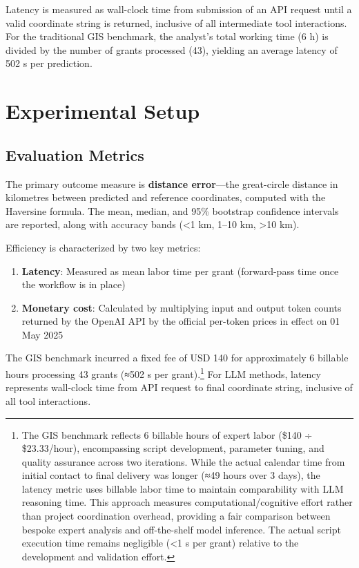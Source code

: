 Latency is measured as wall-clock time from submission of an API request
until a valid coordinate string is returned, inclusive of all
intermediate tool interactions. For the traditional GIS benchmark, the
analyst's total working time (6 h) is divided by the number of grants
processed (43), yielding an average latency of 502 s per prediction.

\section{Experimental Setup}\label{experimental-setup}

\subsection{Evaluation Metrics}\label{evaluation-metrics}

The primary outcome measure is \textbf{distance error}---the
great-circle distance in kilometres between predicted and reference
coordinates, computed with the Haversine formula. The mean, median, and
95\% bootstrap confidence intervals are reported, along with accuracy
bands (\textless1 km, 1--10 km, \textgreater10 km).

Efficiency is characterized by two key metrics:

\begin{enumerate}
\def\labelenumi{\arabic{enumi}.}
\tightlist
\item
  \textbf{Latency}: Measured as mean labor time per grant (forward-pass
  time once the workflow is in place)
\item
  \textbf{Monetary cost}: Calculated by multiplying input and output
  token counts returned by the OpenAI API by the official per-token
  prices in effect on 01 May 2025
\end{enumerate}

The GIS benchmark incurred a fixed fee of USD 140 for approximately 6
billable hours processing 43 grants (≈502 s per grant).\footnote{The GIS
  benchmark reflects 6 billable hours of expert labor (\$140 ÷
  \$23.33/hour), encompassing script development, parameter tuning, and
  quality assurance across two iterations. While the actual calendar
  time from initial contact to final delivery was longer (≈49 hours over
  3 days), the latency metric uses billable labor time to maintain
  comparability with LLM reasoning time. This approach measures
  computational/cognitive effort rather than project coordination
  overhead, providing a fair comparison between bespoke expert analysis
  and off-the-shelf model inference. The actual script execution time
  remains negligible (\textless1 s per grant) relative to the
  development and validation effort.} For LLM methods, latency
represents wall-clock time from API request to final coordinate string,
inclusive of all tool interactions.

